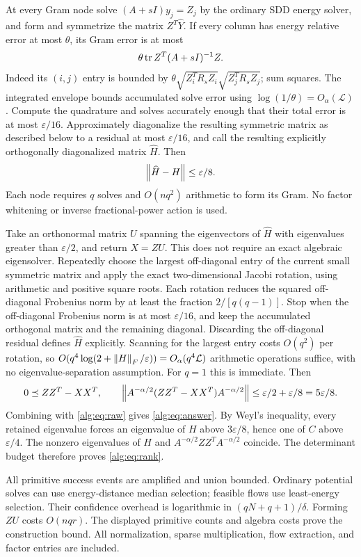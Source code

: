 At every Gram node solve $(A+sI)y_j=Z_j$ by the ordinary SDD energy
solver, and form and symmetrize the matrix $Z^T\widehat Y$.
If every column has energy relative error at most $\theta$, its Gram
error is at most
\[
 \theta\operatorname{tr} Z^T(A+sI)^{-1}Z.
\]
Indeed its $(i,j)$ entry is bounded by
$\theta\sqrt{Z_i^TR_sZ_i}\sqrt{Z_j^TR_sZ_j}$; sum squares.
The integrated envelope bounds accumulated solve error using
$\log(1/\theta)=O_\alpha(\mathcal L)$.
Compute the quadrature and solves accurately enough that their total
error is at most $\varepsilon/16$. Approximately diagonalize the
resulting symmetric matrix as described below to a residual at most
$\varepsilon/16$, and call the resulting explicitly orthogonally
diagonalized matrix $\widehat H$. Then
\begin{equation}\label{alg:eq:gramerr}
 \left\lVert\widehat H-H\right\rVert\le\varepsilon/8.
\end{equation}
Each node requires $q$ solves and $O(nq^2)$ arithmetic to form its
Gram. No factor whitening or inverse fractional-power action is used.

Take an orthonormal matrix $U$ spanning the eigenvectors of
$\widehat H$ with eigenvalues greater than $\varepsilon/2$, and
return $X=ZU$. This does not require an exact algebraic eigensolver.
Repeatedly choose the largest off-diagonal entry of the current small
symmetric matrix and apply the exact two-dimensional Jacobi rotation,
using arithmetic and positive square roots. Each rotation reduces the
squared off-diagonal Frobenius norm by at least the fraction
$2/[q(q-1)]$. Stop when the off-diagonal Frobenius norm is at most $\varepsilon/16$,
and keep the accumulated orthogonal matrix and the remaining diagonal.
Discarding the off-diagonal residual defines $\widehat H$ explicitly.
Scanning for the largest entry costs $O(q^2)$ per rotation, so
$O(q^4\log(2+\left\lVert H\right\rVert_F/\varepsilon))=O_\alpha(q^4\mathcal L)$
arithmetic operations suffice, with no eigenvalue-separation assumption.
For $q=1$ this is immediate. Then
\[
 0\preceq ZZ^T-XX^T,\qquad
 \left\lVert A^{-\alpha/2}(ZZ^T-XX^T)A^{-\alpha/2}\right\rVert
 \le\varepsilon/2+\varepsilon/8=5\varepsilon/8.
\]
Combining with \eqref{alg:eq:raw} gives \eqref{alg:eq:answer}.
By Weyl's inequality, every retained eigenvalue forces an eigenvalue
of $H$ above $3\varepsilon/8$, hence one of $C$ above
$\varepsilon/4$. The nonzero eigenvalues of $H$ and
$A^{-\alpha/2}ZZ^TA^{-\alpha/2}$ coincide. The determinant budget
therefore proves \eqref{alg:eq:rank}.

All primitive success events are amplified and union bounded.
Ordinary potential solves can use energy-distance median selection;
feasible flows use least-energy selection. Their confidence overhead
is logarithmic in $(qN+q+1)/\delta$. Forming $ZU$ costs $O(nqr)$.
The displayed primitive counts and algebra costs prove the construction
bound. All normalization, sparse multiplication, flow extraction, and
factor entries are included.

